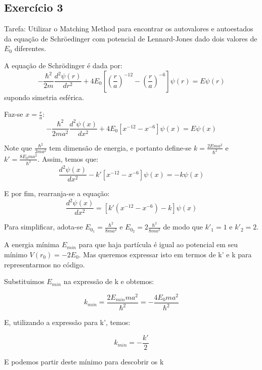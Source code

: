 \documentclass[12pt, a4paper]{article} %
\begin{document}
        \subsection{Exerc\'icio 3}

            Tarefa: Utilizar o Matching Method para encontrar os autovalores e autoestados da equa\c{c}\~ao de Schr\"oedinger com potencial de Lennard-Jones dado dois valores de $E_{0}$ diferentes.

            A equa\c{c}\~ao de Schr\"odinger \'e dada por:
            \begin{equation*}
                -\frac{\hbar^{2}}{2m} \frac{d^{2}\psi(r)}{dr^{2}} + 4E_{0} \left[ \left( \frac{r}{a} \right)^{-12} - \left( \frac{r}{a} \right)^{-6} \right]\psi(r) = E\psi(r)
            \end{equation*}
            supondo simetria esf\'erica.

            Faz-se $x = \frac{r}{a}$:
            \begin{equation*}
                -\frac{\hbar^{2}}{2ma^2} \frac{d^{2}\psi(x)}{dx^{2}} + 4E_{0} \left[ x^{-12} - x^{-6} \right]\psi(x) = E\psi(x)
            \end{equation*}

            Note que $\frac{\hbar^{2}}{2ma^2}$ tem dimens\~ao de energia, e portanto define-se $k = \frac{2Ema^2}{\hbar^{2}}$ e $k' = \frac{8E_{0}ma^2}{\hbar^{2}}$. Assim, temos que:
            \begin{equation*}
                \frac{d^{2}\psi(x)}{dx^{2}} - k'\left[  x^{-12} - x^{-6} \right]\psi(x) = -k\psi(x)
            \end{equation*}

            E por fim, rearranja-se a equa\c{c}\~ao:
            \begin{equation*}
                \frac{d^{2}\psi(x)}{dx^{2}} = \left[k'\left( x^{-12} - x^{-6} \right) -k\right]\psi(x)
            \end{equation*}

            Para simplificar, adota-se $E_{0_{1}} = \frac{\hbar^{2}}{8ma^2}$ e $E_{0_{2}} = 2\frac{\hbar^{2}}{8ma^2}$ de modo que $k'_{1} = 1$ e $k'_{2} = 2$.

            A energia mínima $E_{min}$ para que haja partícula \'e igual ao potencial em seu m\'inimo $V(r_{0}) = -2E_{0}$. Mas queremos expressar isto em termos de k' e k para representarmos no c\'odigo.
            
            Substituimos $E_{min}$ na expressão de k e obtemos:

            \begin{equation}
                k_{min} = \frac{2E_{min}ma^2}{\hbar^{2}} = - \frac{4E_{0}ma^2}{\hbar^{2}}
            \end{equation}

            E, utilizando a expressão para k', temos:

            \begin{equation}
                k_{min} = -\frac{k'}{2}
            \end{equation}

            E podemos partir deste m\'inimo para descobrir os k
              
\end{document}
